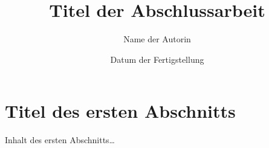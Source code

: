 \documentclass[language=de,degree=bachelor]{./other_pages/mfithesis} %
\begin{document}
\author{Name der Autorin}
\title{Titel der Abschlussarbeit}


\date{Datum der Fertigstellung}




\maketitle %
\tableofcontents %


\section{Titel des ersten Abschnitts}
Inhalt des ersten Abschnitts\ldots





\newpage
\declaration
\end{document}
